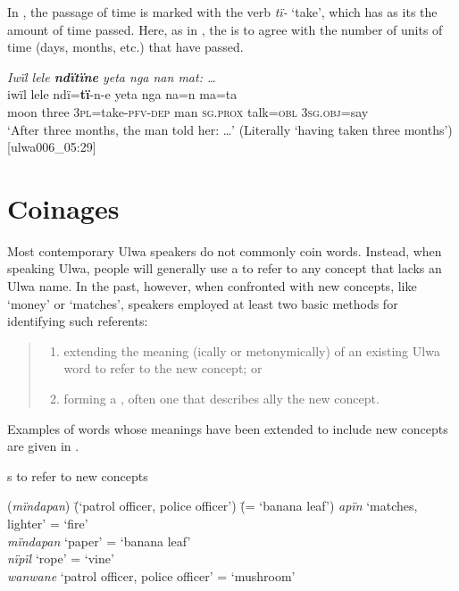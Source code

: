 In , the passage of time is marked with the verb \textit{tï-} ‘take’, which has as its  the amount of time passed. Here, as in , the  is  to agree with the number of units of time (days, months, etc.) that have passed.


\ea%
    \label{ex:sem:33}
          \textit{Iwïl lele \textbf{ndïtïne} yeta nga nan mat: …}\\
\gll    iwïl  lele    ndï=\textbf{tï}{}-n-e      yeta  nga     na=n ma=ta\\
    moon  three  \textsc{3pl}=take-\textsc{pfv-dep}  man  \textsc{sg.prox}  talk=\textsc{obl}    \textsc{3sg.obj}=say\\
\glt `After three months, the man told her: …’ (Literally ‘having taken three months’) [ulwa006\_05:29]
\z


\section{Coinages}\label{sec:14.9}


Most contemporary Ulwa speakers do not commonly coin words. Instead, when speaking Ulwa, people will generally use a   to refer to any concept that lacks an Ulwa name. In the past, however, when confronted with new concepts, like ‘money’ or ‘matches’, speakers employed at least two basic methods for identifying such referents:
  
\begin{quote}
\begin{enumerate}[noitemsep, label={(\roman*)}, align=left, widest=190, labelsep=1ex,leftmargin=*]
\item extending the meaning (ically or  metonymically) of an existing Ulwa word to refer to the new concept; or
\item forming a , often one that describes ally the new concept.
\end{enumerate}
\end{quote}
  
  Examples of words whose meanings have been extended to include new concepts are given in .

\ea%
    \label{ex:sem:34}
          s to refer to new concepts
\begin{tabbing}
{(\textit{mïndapan})} \= {(‘patrol officer, police officer’)} \= {(= ‘banana leaf’)}\kill
{\textit{apïn}} \> {‘matches, lighter’} \> {= ‘fire’}\\
{\textit{mïndapan}} \> {‘paper’} \> {= ‘banana leaf’}\\
{\textit{nïpïl}} \> {‘rope’} \> {= ‘vine’}\\
{\textit{wanwane}} \> {‘patrol officer, police officer’} \> {= ‘mushroom’\footnotemark}
\end{tabbing}
\z
{}

